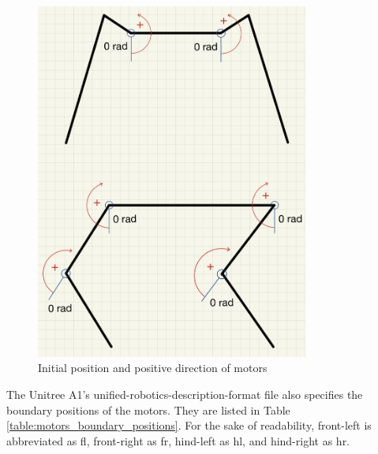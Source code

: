 \begin{figure}[htbp]
   \centering
   \includegraphics[width=0.8\textwidth]{figures/ini_pos_and_positive_direction.png}
   \caption{Initial position and positive direction of motors}
   \label{fig:ini_pos_and_positive_direction}
\end{figure}

The Unitree A1's unified-robotics-description-format file also specifies the boundary positions of the motors. They are listed in Table \ref{table:motors_boundary_positions}. For the sake of readability, front-left is abbreviated as fl, front-right as fr, hind-left as hl, and hind-right as hr.


